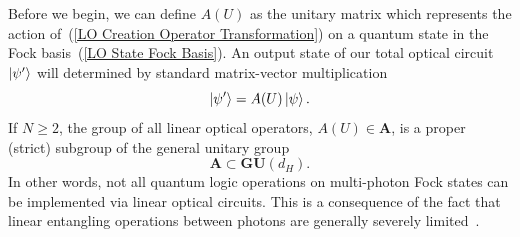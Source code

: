 \documentclass[aps,pra,twocolumn,showpacs,superscriptaddress,floatfix,10pt]{revtex4}
\begin{document}
Before we begin, we can define $A(U)$ as the unitary matrix which represents the action of~(\ref{LO Creation Operator Transformation}) on a quantum state in the Fock basis~(\ref{LO State Fock Basis}). An output state of our total optical circuit $\ket{\psi^\prime}$ will determined by standard matrix-vector multiplication
\begin{equation}
\label{Matrix Vector Product}
\ket{\psi^\prime} = A(U) \ket{\psi}.
\end{equation}
If $N \ge 2$, the group of all linear optical operators, $ A(U) \in \textbf{A}$, is a proper (strict) subgroup of the general unitary group
\begin{equation}
\label{Proper Subgroup}
\textbf{A} \subset \textbf{GU}(d_H).
\end{equation}
In other words, not all quantum logic operations on multi-photon Fock states can be implemented via linear optical circuits. This is a consequence of the fact that linear entangling operations between photons are generally severely limited~\cite{Hong Ou Mandel}. 
\end{document}
